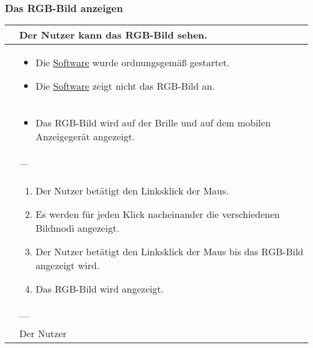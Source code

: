 \subsubsection{Das RGB-Bild anzeigen}
\begin{center}
	\begin{longtable}{| p{3cm} | p{12cm} |}
		\hline
		\goal & Der Nutzer kann das RGB-Bild sehen. \\ \hline
		
		\precondition & \begin{itemize}
			\item Die \hyperlink{tab:anwendung}{Software} wurde ordnungsgemäß gestartet.
			\item Die \hyperlink{tab:anwendung}{Software} zeigt nicht das RGB-Bild an.
		\end{itemize} \\ \hline
		
		\postcondition & \begin{itemize}
			\item Das RGB-Bild wird auf der Brille und auf dem mobilen Anzeigegerät angezeigt.
		\end{itemize} \\ \hline
		
		\postexception & --- \\ \hline
		
		\flow & \begin{enumerate}
			\item Der Nutzer betätigt den Linksklick der Maus.
			\item Es werden für jeden Klick nacheinander die verschiedenen Bildmodi angezeigt.
			\item Der Nutzer betätigt den Linksklick der Maus bis das RGB-Bild angezeigt wird.
			\item Das RGB-Bild wird angezeigt.			
		\end{enumerate} \\ \hline
		
		\exception & --- \\ \hline
		
		\player & Der Nutzer \\
		\hline
	\end{longtable}
\end{center}

